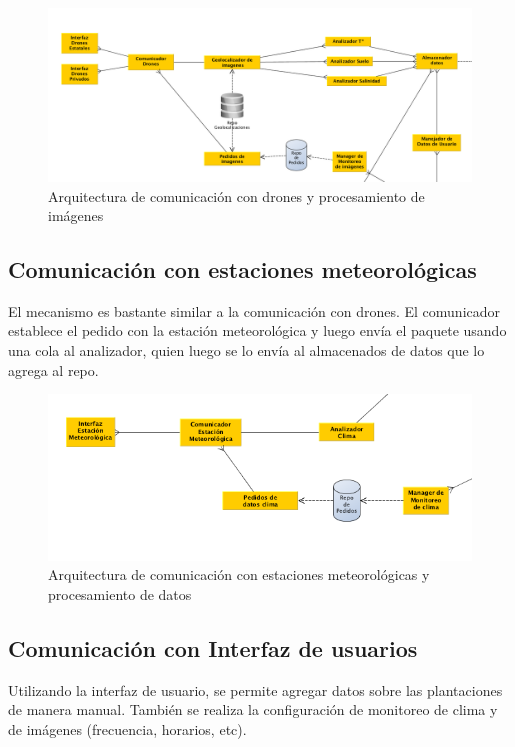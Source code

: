 \begin{figure}[h!]
  \centering
  \includegraphics[width=1\textwidth]{./images/arq_drones.png}
  \caption{Arquitectura de comunicaci\'on con drones y procesamiento de im\'agenes}
  \label{fig:clases4}
\end{figure}

\subsection{Comunicaci\'on con estaciones meteorol\'ogicas}

El mecanismo es bastante similar a la comunicaci\'on con drones. El comunicador establece el pedido con la estaci\'on meteorol\'ogica y luego env\'ia el paquete usando una cola al analizador, quien luego se lo env\'ia al almacenados de datos que lo agrega al repo.

\begin{figure}[h!]
  \centering
  \includegraphics[width=1\textwidth]{./images/arq_clima.png}
  \caption{Arquitectura de comunicaci\'on con estaciones meteorol\'ogicas y procesamiento de datos}
  \label{fig:clases4}
\end{figure}


\subsection{Comunicaci\'on con Interfaz de usuarios}

Utilizando la interfaz de usuario, se permite agregar datos sobre las plantaciones de manera manual. Tambi\'en se realiza la configuraci\'on de monitoreo de clima y de im\'agenes (frecuencia, horarios, etc).

